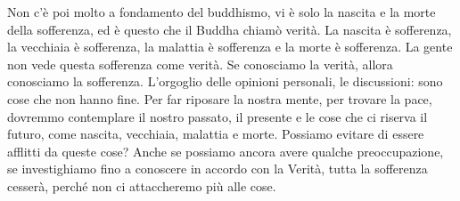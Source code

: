 Non c'è poi molto a fondamento del buddhismo, vi è solo la nascita e la
morte della sofferenza, ed è questo che il Buddha chiamò verità. La
nascita è sofferenza, la vecchiaia è sofferenza, la malattia è
sofferenza e la morte è sofferenza. La gente non vede questa sofferenza
come verità. Se conosciamo la verità, allora conosciamo la sofferenza.
L'orgoglio delle opinioni personali, le discussioni: sono cose che non
hanno fine. Per far riposare la nostra mente, per trovare la pace,
dovremmo contemplare il nostro passato, il presente e le cose che ci
riserva il futuro, come nascita, vecchiaia, malattia e morte. Possiamo
evitare di essere afflitti da queste cose? Anche se possiamo ancora
avere qualche preoccupazione, se investighiamo fino a conoscere in
accordo con la Verità, tutta la sofferenza cesserà, perché non ci
attaccheremo più alle cose.
